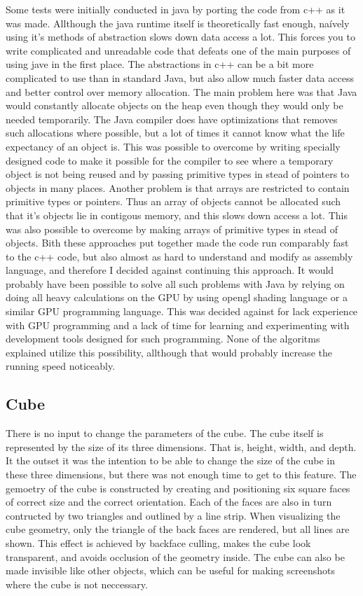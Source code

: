 \documentclass[a4paper,12pt]{report}
\begin{document}
Some tests were initially conducted in java by porting the code from c++ as it was made. Allthough the java runtime itself is theoretically fast enough, naívely using it's methods of abstraction slows down data access a lot. This forces you to write complicated and unreadable code that defeats one of the main purposes of using jave in the first place. The abstractions in c++ can be a bit more complicated to use than in standard Java, but also allow much faster data access and better control over memory allocation. The main problem here was that Java would constantly allocate objects on the heap even though they would only be needed temporarily. The Java compiler does have optimizations that removes such allocations where possible, but a lot of times it cannot know what the life expectancy of an object is. This was possible to overcome by writing specially designed code to make it possible for the compiler to see where a temporary object is not being reused and by passing primitive types in stead of pointers 
to objects in many places. Another problem is that arrays are restricted to contain primitive types or pointers. Thus an array of objects cannot be allocated such that it's objects lie in contigous memory, and this slows down access a lot. This was also possible to overcome by making arrays of primitive types in stead of objects. Bith these approaches put together made the code run comparably fast to the c++ code, but also almost as hard to understand and modify as assembly language, and therefore I decided against continuing this approach. It would probably have been possible to solve all such problems with Java by relying on doing all heavy calculations on the GPU by using opengl shading language or a similar GPU programming language. This was decided against for lack experience with GPU programming and a lack of time for learning and experimenting with development tools designed for such programming. None of the algoritms explained utilize this possibility, allthough that would probably increase the 
running speed noticeably.

\subsection{Cube}
There is no input to change the parameters of the cube. The cube itself is represented by the size of its three dimensions. That is, height, width, and depth. It the outset it was the intention to be able to change the size of the cube in these three dimensions, but there was not enough time to get to this feature. The gemoetry of the cube is constructed by creating and positioning six square faces of correct size and the correct orientation. Each of the faces are also in turn contructed by two triangles and outlined by a line strip. When visualizing the cube geometry, only the triangle of the back faces are rendered, but all lines are shown. This effect is achieved by backface culling, makes the cube look transparent, and avoids occlusion of the geometry inside. The cube can also be made invisible like other objects, which can be useful for making screenshots where the cube is not neccessary.
\end{document}
